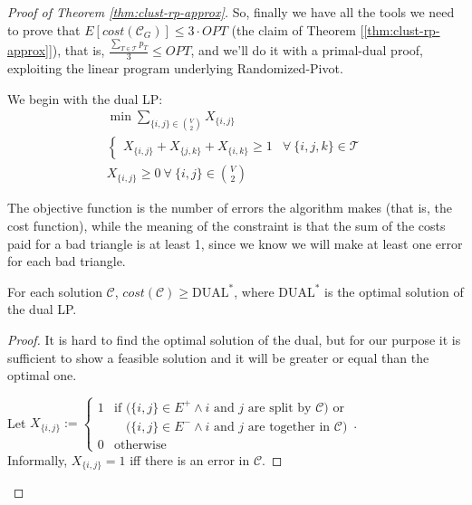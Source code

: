 \begin{proof}[Proof of Theorem \ref{thm:clust-rp-approx}]
    So, finally we have all the tools we need to prove that $E\left[cost\left( \mathscr{C}_G \right)\right] \leq 3 \cdot OPT$ (the claim of Theorem [\ref{thm:clust-rp-approx}]), that is, $\frac{\sum_{T \in \mathscr{T}} p_T}{3} \leq OPT$, and we'll do it with a primal-dual proof, exploiting the linear program underlying Randomized-Pivot.
    
    We begin with the dual LP:
    \begin{equation}\label{lp:clust-dual}
        \begin{aligned}
            &\min \sum_{\{i,j\} \in \binom{V}{2}} X_{\{i,j\}}&\\
            &\begin{cases}
                X_{\{i,j\}} + X_{\{j,k\}} + X_{\{i,k\}} \geq 1 & \forall\ \{i,j,k\} \in \mathscr{T}
            \end{cases}&\\
            &X_{\{i,j\}} \geq 0 \ \forall\ \{i,j\} \in \binom{V}{2}&
        \end{aligned}
    \end{equation}
    
    \obs The objective function is the number of errors the algorithm makes (that is, the cost function), while the meaning of the constraint is that the sum of the costs paid for a bad triangle is at least 1, since we know we will make at least one error for each bad triangle.
    
    \begin{lem}\label{l:clust-3}
        For each solution $\mathscr{C}$, $cost(\mathscr{C}) \geq \text{DUAL}^*$, where $\text{DUAL}^*$ is the optimal solution of the dual LP.
    \end{lem}
    \begin{proof}
        It is hard to find the optimal solution of the dual, but for our purpose it is sufficient to show a feasible solution and it will be greater or equal than the optimal one.
        
        Let $X_{\{i,j\}} := \begin{cases}
        1 & \text{if } \big( \{i,j\} \in E^+ \wedge i \text{ and } j \text{ are split by } \mathscr{C} \big) \text{ or }\\
        &\phantom{\text{if }} \big( \{i,j\} \in E^- \wedge i \text{ and } j \text{ are together in } \mathscr{C} \big)\\
        0 & \text{otherwise}
        \end{cases}$.\\
        Informally, $X_{\{i,j\}}=1$ iff there is an error in $\mathscr{C}$.
        

\end{proof}
\end{proof}
